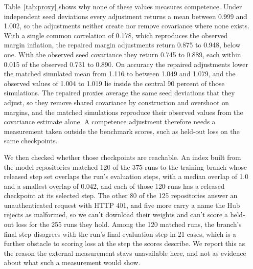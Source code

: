 Table~\ref{tab:proxy} shows why none of these values measures competence. Under independent seed deviations every adjustment returns a mean between 0.999 and 1.002, so the adjustments neither create nor remove covariance where none exists. With a single common correlation of 0.178, which reproduces the observed margin inflation, the repaired margin adjustments return 0.875 to 0.948, below one. With the observed seed covariance they return 0.745 to 0.889, each within 0.015 of the observed 0.731 to 0.890. On accuracy the repaired adjustments lower the matched simulated mean from 1.116 to between 1.049 and 1.079, and the observed values of 1.004 to 1.019 lie inside the central 90 percent of those simulations. The repaired proxies average the same seed deviations that they adjust, so they remove shared covariance by construction and overshoot on margins, and the matched simulations reproduce their observed values from the covariance estimate alone. A competence adjustment therefore needs a measurement taken outside the benchmark scores, such as held-out loss on the same checkpoints.

We then checked whether those checkpoints are reachable. An index built from the model repositories matched 120 of the 375 runs to the training branch whose released step set overlaps the run's evaluation steps, with a median overlap of 1.0 and a smallest overlap of 0.042, and each of those 120 runs has a released checkpoint at its selected step. The other 80 of the 125 repositories answer an unauthenticated request with HTTP 401, and five more carry a name the Hub rejects as malformed, so we can't download their weights and can't score a held-out loss for the 255 runs they hold. Among the 120 matched runs, the branch's final step disagrees with the run's final evaluation step in 21 cases, which is a further obstacle to scoring loss at the step the scores describe. We report this as the reason the external measurement stays unavailable here, and not as evidence about what such a measurement would show.

